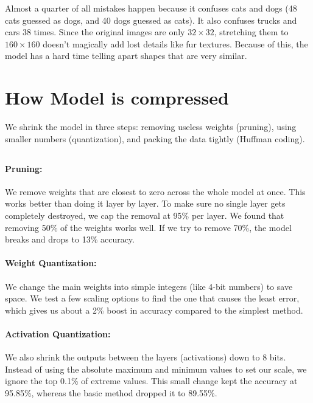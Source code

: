 \documentclass[11pt,a4paper]{article}
\begin{document}
Almost a quarter of all mistakes happen because it confuses cats and dogs (48 cats guessed as dogs, and 40 dogs guessed as cats). It also confuses trucks and cars 38 times. Since the original images are only $32\times32$, stretching them to $160\times160$ doesn't magically add lost details like fur textures. Because of this, the model has a hard time telling apart shapes that are very similar.


\section{How Model is compressed}

\label{sec:compression}


We shrink the model in three steps: removing useless weights (pruning), using smaller numbers (quantization), and packing the data tightly (Huffman coding).

\subsection{}

\paragraph{Pruning:} We remove weights that are closest to zero across the whole model at once. This works better than doing it layer by layer. To make sure no single layer gets completely destroyed, we cap the removal at 95\% per layer. We found that removing 50\% of the weights works well. If we try to remove 70\%, the model breaks and drops to 13\% accuracy.

\paragraph{Weight Quantization:} We change the main weights into simple integers (like 4-bit numbers) to save space. We test a few scaling options to find the one that causes the least error, which gives us about a 2\% boost in accuracy compared to the simplest method.

\paragraph{Activation Quantization:} We also shrink the outputs between the layers (activations) down to 8 bits. Instead of using the absolute maximum and minimum values to set our scale, we ignore the top 0.1\% of extreme values. This small change kept the accuracy at 95.85\%, whereas the basic method dropped it to 89.55\%.
\end{document}
